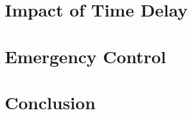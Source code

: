 \documentclass[12pt]{report}
\begin{document}
\chapter{Impact of Time Delay}
\label{Chapter5}







\chapter{Emergency Control}
\label{Chapter6}






\chapter{Conclusion}
\label{Chapter7}




\end{document}
